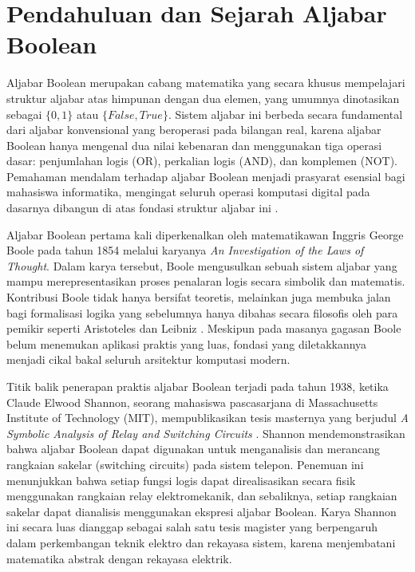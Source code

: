 \section{Pendahuluan dan Sejarah Aljabar Boolean}

Aljabar Boolean merupakan cabang matematika yang secara khusus mempelajari struktur aljabar atas himpunan dengan dua elemen, yang umumnya dinotasikan sebagai $\{0, 1\}$ atau $\{False, True\}$. Sistem aljabar ini berbeda secara fundamental dari aljabar konvensional yang beroperasi pada bilangan real, karena aljabar Boolean hanya mengenal dua nilai kebenaran dan menggunakan tiga operasi dasar: penjumlahan logis (OR), perkalian logis (AND), dan komplemen (NOT). Pemahaman mendalam terhadap aljabar Boolean menjadi prasyarat esensial bagi mahasiswa informatika, mengingat seluruh operasi komputasi digital pada dasarnya dibangun di atas fondasi struktur aljabar ini \cite{rosen2019}.

Aljabar Boolean pertama kali diperkenalkan oleh matematikawan Inggris George Boole pada tahun 1854 melalui karyanya \textit{An Investigation of the Laws of Thought}. Dalam karya tersebut, Boole mengusulkan sebuah sistem aljabar yang mampu merepresentasikan proses penalaran logis secara simbolik dan matematis. Kontribusi Boole tidak hanya bersifat teoretis, melainkan juga membuka jalan bagi formalisasi logika yang sebelumnya hanya dibahas secara filosofis oleh para pemikir seperti Aristoteles dan Leibniz \cite{wiki_boolean}. Meskipun pada masanya gagasan Boole belum menemukan aplikasi praktis yang luas, fondasi yang diletakkannya menjadi cikal bakal seluruh arsitektur komputasi modern.

Titik balik penerapan praktis aljabar Boolean terjadi pada tahun 1938, ketika Claude Elwood Shannon, seorang mahasiswa pascasarjana di Massachusetts Institute of Technology (MIT), mempublikasikan tesis masternya yang berjudul \textit{A Symbolic Analysis of Relay and Switching Circuits} \cite{shannon1938}. Shannon mendemonstrasikan bahwa aljabar Boolean dapat digunakan untuk menganalisis dan merancang rangkaian sakelar (switching circuits) pada sistem telepon. Penemuan ini menunjukkan bahwa setiap fungsi logis dapat direalisasikan secara fisik menggunakan rangkaian relay elektromekanik, dan sebaliknya, setiap rangkaian sakelar dapat dianalisis menggunakan ekspresi aljabar Boolean. Karya Shannon ini secara luas dianggap sebagai salah satu tesis magister yang berpengaruh dalam perkembangan teknik elektro dan rekayasa sistem, karena menjembatani matematika abstrak dengan rekayasa elektrik.

